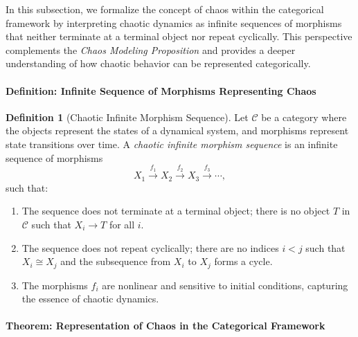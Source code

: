 \documentclass{article}
\theoremstyle{definition}
\newtheorem{definition}{Definition}[section]
\theoremstyle{remark}
\begin{document}
	In this subsection, we formalize the concept of chaos within the categorical framework by interpreting chaotic dynamics as infinite sequences of morphisms that neither terminate at a terminal object nor repeat cyclically. This perspective complements the \emph{Chaos Modeling Proposition} and provides a deeper understanding of how chaotic behavior can be represented categorically.
	
	\paragraph{Definition: Infinite Sequence of Morphisms Representing Chaos}
	
	\begin{definition}[Chaotic Infinite Morphism Sequence]
		Let $\mathcal{C}$ be a category where the objects represent the states of a dynamical system, and morphisms represent state transitions over time. A \emph{chaotic infinite morphism sequence} is an infinite sequence of morphisms
		\[
		X_1 \xrightarrow{f_1} X_2 \xrightarrow{f_2} X_3 \xrightarrow{f_3} \cdots,
		\]
		such that:
		\begin{enumerate}
			\item The sequence does not terminate at a terminal object; there is no object $T$ in $\mathcal{C}$ such that $X_i \rightarrow T$ for all $i$.
			\item The sequence does not repeat cyclically; there are no indices $i < j$ such that $X_i \cong X_j$ and the subsequence from $X_i$ to $X_j$ forms a cycle.
			\item The morphisms $f_i$ are nonlinear and sensitive to initial conditions, capturing the essence of chaotic dynamics.
		\end{enumerate}
	\end{definition}
	
	\paragraph{Theorem: Representation of Chaos in the Categorical Framework}
	
\end{document}
